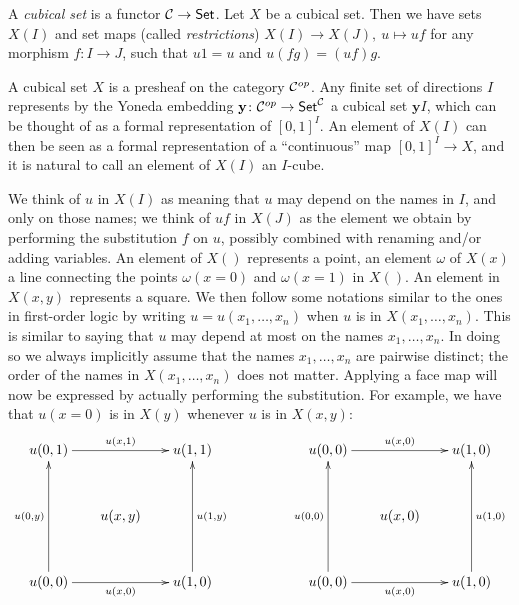 \documentclass[10pt,a4paper]{article}
\newcommand{\CC}{{\mathcal C}}
\newcommand{\yoneda}{\mathbf{y}}
\begin{document}
A \emph{cubical set} is a functor $\CC\to{\sf Set}$.  Let $X$ be a
cubical set. Then we have sets $X(I)$ and set maps (called
\emph{restrictions}) $X(I)\to X(J),~u\longmapsto uf$ for any morphism
$f:I\to J$, such that $u1 = u$ and $u(fg) = (uf)g$.

\medskip

A cubical set $X$ is a presheaf on the category ${\cal C}^{op}$. Any
finite set of directions $I$ represents by the Yoneda embedding
$\yoneda \colon {\cal C}^{op} \to {\sf Set}^{\cal C}$ a cubical set
$\yoneda I$, which can be thought of as a formal representation of
$[0,1]^I$.  An element of $X(I)$ can then be seen as a formal
representation of a ``continuous'' map $[0,1]^I\to X$, and it is
natural to call an element of $X(I)$ an $I$-cube.

We think of $u$ in $X(I)$ as meaning that $u$ may depend on the names
in $I$, and only on those names; we think of $uf$ in $X(J)$ as the
element we obtain by performing the substitution $f$ on $u$, possibly
combined with renaming and/or adding variables.  An element of $X()$
represents a point, an element $\omega$ of $X(x)$ a line connecting
the points $\omega(x=0)$ and $\omega(x=1)$ in $X()$. An element in
$X(x,y)$ represents a square.  We then follow some notations similar
to the ones in first-order logic by writing $u = u(x_1,\dots,x_n)$
when $u$ is in $X(x_1,\dots,x_n)$. This is similar to saying that $u$
may depend at most on the names $x_1,\dots,x_n$.  In doing so we
always implicitly assume that the names $x_1,\dots,x_n$ are pairwise
distinct; the order of the names in $X(x_1,\dots,x_n)$ does not
matter. Applying a face map will now be expressed by actually
performing the substitution. For example, we have that $u(x=0)$ is in
$X(y)$ whenever $u$ is in $X(x,y)$:
\[
\xymatrix@R=1.1cm@C=.6cm{
u(0,1)\ar[rr]^{u(x,1)}                &      & u(1,1)                   &&&
u(0,0)\ar[rr]^{u(x,0)}                &      & u(1,0)                       \\
                                      &u(x,y)&                          &&&
                                      &u(x,0)&                              \\
u(0,0)\ar[rr]_{u(x,0)}\ar[uu]^{u(0,y)}&      & u(1,0)\ar[uu]_{u(1,y)}   &&&
u(0,0)\ar[rr]_{u(x,0)}\ar[uu]^{u(0,0)}&      & u(1,0)\ar[uu]_{u(1,0)}       \\
}
\]
\end{document}

